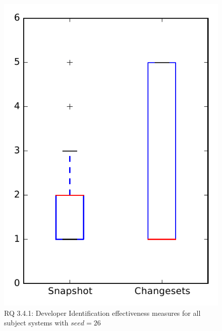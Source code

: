 
\begin{figure}
\centering
\includegraphics[height=0.4\textheight]{figures/dit_seed/rq1_overview_26}
\caption{RQ 3.4.1: Developer Identification effectiveness measures for all subject systems with $seed=26$}
\label{fig:dit_seed:rq1:overview}
\end{figure}
